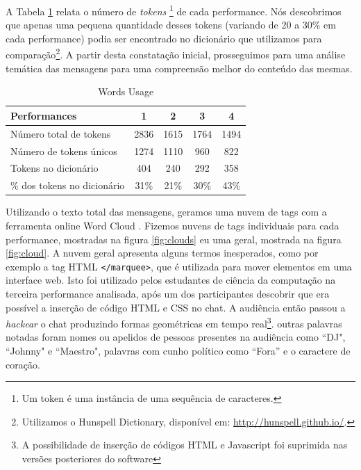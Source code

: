 A Tabela \ref{tab:words} relata o número de \emph{tokens} \footnote{Um token é uma instância de uma sequência de caracteres.} de cada performance. Nós descobrimos que apenas uma pequena quantidade desses tokens (variando de 20 a 30\% em cada performance) podia ser encontrado no dicionário que utilizamos para comparação\footnote{Utilizamos o Hunspell Dictionary, disponível em: \url{http://hunspell.github.io/}.}. A partir desta constatação inicial, prosseguimos para uma análise temática das mensagens para uma compreensão melhor do conteúdo das mesmas.




\begin{table}[ht!]
\caption{Words Usage}{%
\begin{tabular}{@{}lcccc@{}}
\hline
Performances & 1 & 2 & 3 & 4 \\
\hline
Número total de tokens&     2836&   1615&  1764&   1494\\
Número de tokens únicos& 1274& 1110& 960& 822\\
Tokens no dicionário &      404&   240&  292&   358\\
\% dos tokens no dicionário &       31\%&   21\%&  30\%&   43\%\\
\end{tabular}}
\label{tab:words}
\end{table}

Utilizando o texto total das mensagens, geramos uma nuvem de tags com a ferramenta online Word Cloud \cite{JasonDavies}. Fizemos nuvens de tags individuais para cada performance, mostradas na figura \ref{fig:clouds} eu uma geral, mostrada na figura \ref{fig:cloud}. A nuvem geral apresenta alguns termos inesperados, como por exemplo a tag HTML \texttt{</marquee>}, que é utilizada para mover elementos em uma interface web. Isto foi utilizado pelos estudantes de ciência da computação na terceira performance analisada, após um dos participantes descobrir que era possível a inserção de código HTML e CSS no chat. A audiência então passou a \emph{hackear} o chat produzindo formas geométricas em tempo real\footnote{A possibilidade de inserção de códigos HTML e Javascript foi suprimida nas versões posteriores do software}. outras palavras notadas foram nomes ou apelidos de pessoas presentes na audiência como ``DJ", ``Johnny" e ``Maestro", palavras com cunho político como ``Fora'' e o caractere de coração. 


